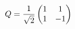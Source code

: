 \documentclass[preview]{standalone}
\begin{document}
\begin{align*}
\special{dvisvgm:raw <g id='unique000'>}Q=\frac1{\sqrt2}\begin{pmatrix}1&1\\1&-1\end{pmatrix}\special{dvisvgm:raw </g>}
\end{align*}
\end{document}
